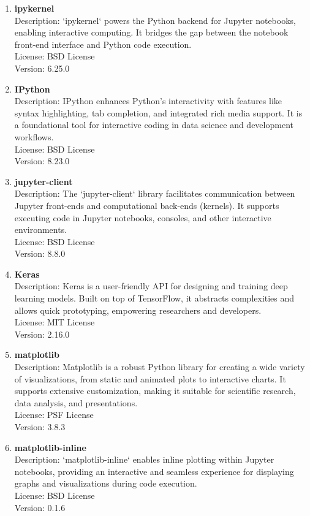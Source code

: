 \begin{enumerate}
	\item \textbf{ipykernel} \\
	Description: `ipykernel` powers the Python backend for Jupyter notebooks, enabling interactive computing. It bridges the gap between the notebook front-end interface and Python code execution. \\
	License: BSD License \\
	Version: 6.25.0
	
	\item \textbf{IPython} \\
	Description: IPython enhances Python's interactivity with features like syntax highlighting, tab completion, and integrated rich media support. It is a foundational tool for interactive coding in data science and development workflows. \\
	License: BSD License \\
	Version: 8.23.0
	
	\item \textbf{jupyter-client} \\
	Description: The `jupyter-client` library facilitates communication between Jupyter front-ends and computational back-ends (kernels). It supports executing code in Jupyter notebooks, consoles, and other interactive environments. \\
	License: BSD License \\
	Version: 8.8.0
	
	\item \textbf{Keras} \\
	Description: Keras is a user-friendly API for designing and training deep learning models. Built on top of TensorFlow, it abstracts complexities and allows quick prototyping, empowering researchers and developers. \\
	License: MIT License \\
	Version: 2.16.0
	
	\item \textbf{matplotlib} \\
	Description: Matplotlib is a robust Python library for creating a wide variety of visualizations, from static and animated plots to interactive charts. It supports extensive customization, making it suitable for scientific research, data analysis, and presentations. \\
	License: PSF License \\
	Version: 3.8.3
	
	\item \textbf{matplotlib-inline} \\
	Description: `matplotlib-inline` enables inline plotting within Jupyter notebooks, providing an interactive and seamless experience for displaying graphs and visualizations during code execution. \\
	License: BSD License \\
	Version: 0.1.6
	

\end{enumerate}
